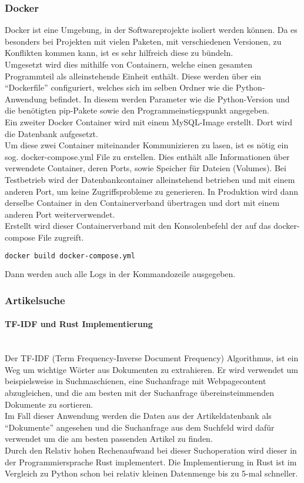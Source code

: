 \subsubsection{Docker}


    Docker ist eine Umgebung, in der Softwareprojekte isoliert werden können. Da es besonders  bei Projekten mit vielen Paketen, mit verschiedenen Versionen, zu Konflikten kommen kann, ist es sehr hilfreich diese zu bündeln. \\
    Umgesetzt wird dies mithilfe von Containern, welche einen gesamten Programmteil als alleinstehende Einheit enthält. Diese werden über ein \enquote{Dockerfile} configuriert, welches sich im selben Ordner wie die Python-Anwendung befindet. In diesem werden Parameter wie die Python-Version und die benötigten pip-Pakete sowie den Programmeinstiegspunkt angegeben. \\ 
    Ein zweiter Docker Container wird mit einem MySQL-Image erstellt. Dort wird die Datenbank aufgesetzt. \\
    Um diese zwei Container miteinander Kommunizieren zu lasen, ist es nötig ein sog. docker-compose.yml File zu erstellen. Dies enthält alle Informationen über verwendete Container, deren Ports, sowie Speicher für Dateien (Volumes). Bei Testbetrieb wird der Datenbankcontainer alleinstehend betrieben und mit einem anderen Port, um keine Zugriffsprobleme zu generieren. In Produktion wird dann derselbe Container in den Containerverband übertragen und dort mit einem anderen Port weiterverwendet. \\
    Erstellt wird dieser Containerverband mit den Konsolenbefehl der auf das docker-compose File zugreift. 
    \begin{lstlisting}[language=bash]
        docker build docker-compose.yml\end{lstlisting}
    Dann werden auch alle Logs in der Kommandozeile ausgegeben. 


\subsubsection{Artikelsuche}
\paragraph{TF-IDF und Rust Implementierung} \hspace{0pt} \\
Der TF-IDF (Term Frequency-Inverse Document Frequency) Algorithmus, ist ein Weg um wichtige Wörter aus Dokumenten zu extrahieren. Er wird verwendet um beispielsweise in Suchmaschienen, eine Suchanfrage mit Webpagecontent abzugleichen, und die am besten mit der Suchanfrage übereinsteimmenden Dokumente zu sortieren. \\
Im Fall dieser Anwendung werden die Daten aus der Artikeldatenbank als \enquote{Dokumente}  angesehen und die Suchanfrage aus dem Suchfeld wird dafür verwendet um die am besten passenden Artikel zu finden.
\\
Durch den Relativ hohen Rechenaufwand bei dieser Suchoperation wird dieser in der Programmiersprache Rust implementert. Die Implementierung in Rust ist im Vergleich zu Python schon bei relativ kleinen Datenmenge bis zu 5-mal schneller.

